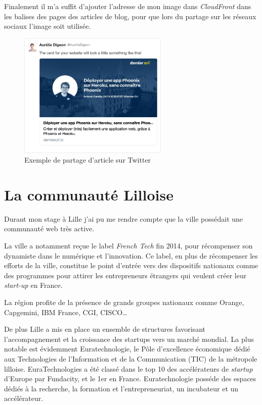 \bigskip

Finalement il m'a suffit d'ajouter l'adresse de mon image dans
\emph{CloudFront} dans les balises des pages des articles de blog, pour
que lors du partage sur les réseaux sociaux l'image soit utilisée.

\begin{figure}[h]
  \centering
  \includegraphics[height=6cm]{figures/partage-blog.png}
  \caption{Exemple de partage d'article sur Twitter}
\end{figure}

\newpage

\section{La communauté Lilloise}\label{la-communautuxe9-lilloise}

Durant mon stage à Lille j'ai pu me rendre compte que la ville possédait
une communauté web très active.

\bigskip

La ville a notamment reçue le label \emph{French Tech} fin 2014, pour
récompenser son dynamiste dans le numérique et l'innovation. Ce label,
en plus de récompenser les efforts de la ville, constitue le point
d'entrée vers des dispositifs nationaux comme des programmes pour
attirer les entrepreneurs étrangers qui veulent créer leur
\emph{start-up} en France.

\bigskip

La région profite de la présence de grands groupes nationaux comme
Orange, Capgemini, IBM France, CGI, CISCO\ldots{}

\bigskip

De plus Lille a mis en place un ensemble de structures favorisant
l'accompagnement et la croissance des startups vers un marché mondial.
La plus notable est évidemment Euratechnologie, le Pôle d'excellence
économique dédié aux Technologies de l'Information et de la
Communication (TIC) de la métropole lilloise. EuraTechnologies a été
classé dans le top 10 des accélérateurs de \emph{startup} d'Europe par
Fundacity, et le 1er en France. Euratechnologie posséde des espaces
dédiés à la recherche, la formation et l'entrepreneuriat, un incubateur
et un accélérateur.

